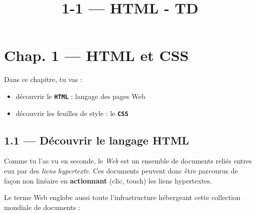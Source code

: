 \documentclass[a4paper,17pt]{extarticle}
\title{1-1 --- HTML - TD}
\providecommand{\tightlist}{%
      \setlength{\itemsep}{0pt}\setlength{\parskip}{0pt}}
\begin{document}
    
    

    
    

    
    \hypertarget{chap.-1-html-et-css}{%
\section{Chap. 1 --- HTML et CSS}\label{chap.-1-html-et-css}}

    Dans ce chapitre, tu vas :

\begin{itemize}
\tightlist
\item
  découvrir le \textbf{\texttt{HTML}} : langage des pages Web
\item
  découvrir les feuilles de style : le \textbf{\texttt{CSS}}
\end{itemize}

    \hypertarget{duxe9couvrir-le-langage-html}{%
\subsection{1.1 --- Découvrir le langage
HTML}\label{duxe9couvrir-le-langage-html}}

    Comme tu l'as vu en seconde, le \emph{Web} est un ensemble de documents
reliés entres eux par des \emph{liens hypertexte}. Ces documents peuvent
donc être parcourus de façon non linéaire en \textbf{actionnant} (clic,
touch) les liens hypertextes.

Le terme Web englobe aussi toute l'infrastructure hébergeant cette
collection mondiale de documents :
\end{document}
